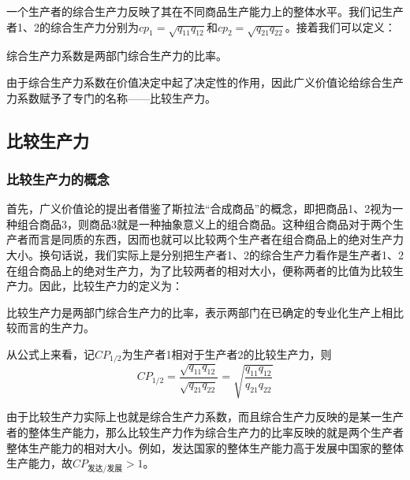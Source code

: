 一个生产者的综合生产力反映了其在不同商品生产能力上的整体水平\cite[81]{CaiJiMingCongXiaYiJieZhiLunDaoGuangYiJieZhiLunXiuDingBan2022}。我们记生产者1、2的综合生产力分别为$ \mathit{cp}_1 = \sqrt{q_{11}q_{12}} $和$ \mathit{cp}_2 = \sqrt{q_{21}q_{22}} $。接着我们可以定义：

\begin{definition}
    综合生产力系数是两部门综合生产力的比率\cite[71]{CaiJiMingCongXiaYiJieZhiLunDaoGuangYiJieZhiLunXiuDingBan2022}。
\end{definition}

由于综合生产力系数在价值决定中起了决定性的作用，因此广义价值论给综合生产力系数赋予了专门的名称——比较生产力。


\subsection{比较生产力}

\subsubsection{比较生产力的概念}

首先，广义价值论的提出者借鉴了斯拉法“合成商品”的概念，即把商品1、2视为一种组合商品3，则商品3就是一种抽象意义上的组合商品\cite[293]{CaiJiMingGuangYiJieZhiLun2001}。这种组合商品对于两个生产者而言是同质的东西，因而也就可以比较两个生产者在组合商品上的绝对生产力大小。换句话说，我们实际上是分别把生产者1、2的综合生产力看作是生产者1、2在组合商品上的绝对生产力，为了比较两者的相对大小，便称两者的比值为比较生产力。因此，比较生产力的定义为：
\begin{definition}
    比较生产力是两部门综合生产力的比率，表示两部门在已确定的专业化生产上相比较而言的生产力\cite[264]{CaiJiMingCongGuDianZhengZhiJingJiXueDaoZhongGuoTeSeSheHuiZhuYiZhengZhiJingJiXueJiYuZhongGuoShiJiaoDeZhengZhiJingJiXueYanBianShangCe2023}。
\end{definition}

从公式上来看，记$ \mathit{CP}_{1/2} $为生产者1相对于生产者2的比较生产力，则
\begin{equation}
    \mathit{CP}_{1/2} = \frac{\sqrt{q_{11} q_{12}}}{\sqrt{q_{21}q_{22}}} = \sqrt{\frac{q_{11} q_{12}}{q_{21}q_{22}}}
\end{equation}

由于比较生产力实际上也就是综合生产力系数\cite[264]{CaiJiMingCongGuDianZhengZhiJingJiXueDaoZhongGuoTeSeSheHuiZhuYiZhengZhiJingJiXueJiYuZhongGuoShiJiaoDeZhengZhiJingJiXueYanBianShangCe2023}，而且综合生产力反映的是某一生产者的整体生产能力，那么比较生产力作为综合生产力的比率反映的就是两个生产者整体生产能力的相对大小。例如，发达国家的整体生产能力高于发展中国家的整体生产能力，故$ \mathit{CP}_{\text{发达}/\text{发展}} > 1 $。

